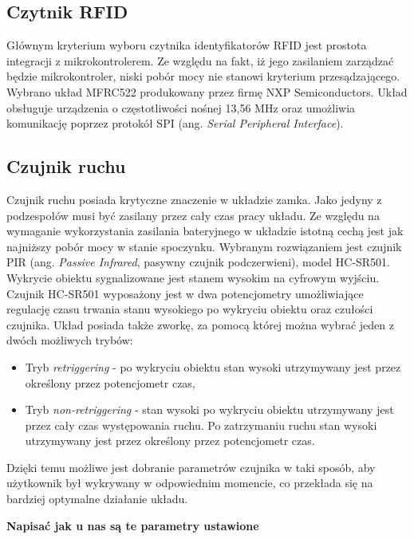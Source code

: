         \subsection{Czytnik RFID}

            Głównym kryterium wyboru czytnika identyfikatorów RFID jest prostota integracji z mikrokontrolerem. Ze względu na fakt, iż jego zasilaniem zarządzać będzie mikrokontroler, niski pobór mocy nie stanowi kryterium przesądzającego. Wybrano układ MFRC522 produkowany przez firmę NXP Semiconductors. Układ obsługuje urządzenia o częstotliwości nośnej 13,56 MHz oraz umożliwia komunikację poprzez protokół SPI (ang. \textit{Serial Peripheral Interface}).

        \subsection{Czujnik ruchu}

            Czujnik ruchu posiada krytyczne znaczenie w układzie zamka. Jako jedyny z podzespołów musi być zasilany przez cały czas pracy układu. Ze względu na wymaganie wykorzystania zasilania bateryjnego w układzie istotną cechą jest jak najniższy pobór mocy w stanie spoczynku. Wybranym rozwiązaniem jest czujnik PIR (ang. \textit{Passive Infrared}, pasywny czujnik podczerwieni), model HC-SR501. Wykrycie obiektu sygnalizowane jest stanem wysokim na cyfrowym wyjściu. Czujnik HC-SR501 wyposażony jest w dwa potencjometry umożliwiające regulację czasu trwania stanu wysokiego po wykryciu obiektu oraz czułości czujnika. Układ posiada także zworkę, za pomocą której można wybrać jeden z dwóch możliwych trybów:

            \begin{itemize}
                \item Tryb \textit{retriggering} - po wykryciu obiektu stan wysoki utrzymywany jest przez określony przez potencjometr czas,
                \item Tryb \textit{non-retriggering} - stan wysoki po wykryciu obiektu utrzymywany jest przez cały czas występowania ruchu. Po zatrzymaniu ruchu stan wysoki utrzymywany jest przez określony przez potencjometr czas.
            \end{itemize}

            Dzięki temu możliwe jest dobranie parametrów czujnika w taki sposób, aby użytkownik był wykrywany w odpowiednim momencie, co przekłada się na bardziej optymalne działanie układu.

            \textbf{Napisać jak u nas są te parametry ustawione}

